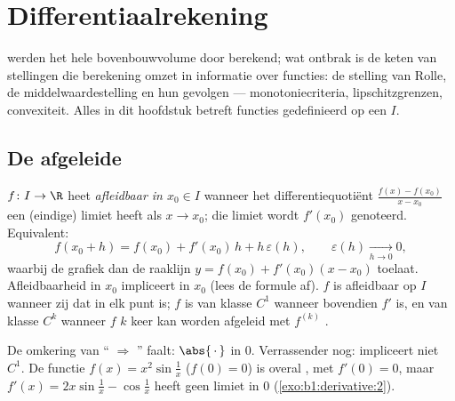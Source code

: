 \chapter{Differentiaalrekening}\label{ch:b1:derivative}

 werden het hele bovenbouwvolume door berekend; wat ontbrak
is de keten van stellingen die berekening omzet in informatie over
functies: de stelling van Rolle, de middelwaardestelling en hun
gevolgen --- monotoniecriteria, lipschitzgrenzen, convexiteit. Alles
in dit hoofdstuk betreft functies gedefinieerd op een  $I$.

\section{De afgeleide}

\begin{definition}\label{def:b1:derivative:def}
$f \colon I \to \R$ heet \emph{afleidbaar in $x_0 \in
I$} wanneer het differentiequotiënt
$\frac{f(x) - f(x_0)}{x - x_0}$ een (eindige) limiet heeft als $x \to
x_0$; die limiet wordt $f'(x_0)$ genoteerd. Equivalent:
\[
f(x_0 + h) = f(x_0) + f'(x_0)\,h + h\,\varepsilon(h),
\qquad \varepsilon(h) \xrightarrow[h \to 0]{} 0 ,
\]
waarbij de grafiek dan de raaklijn $y = f(x_0) + f'(x_0)(x - x_0)$
toelaat. Afleidbaarheid in $x_0$ impliceert  in $x_0$
(lees de formule af). $f$ is afleidbaar op $I$ wanneer zij dat in elk
punt is; $f$ is van klasse $C^1$ wanneer bovendien $f'$  is,
en van klasse $C^k$ wanneer $f$ $k$
keer kan worden afgeleid met $f^{(k)}$ .
\end{definition}

\begin{example}\label{ex:b1:derivative:notc1}
De omkering van `` $\Rightarrow$ '' faalt:
$\abs{\,\cdot\,}$ in $0$. Verrassender nog:  impliceert
niet $C^1$. De functie $f(x) = x^2 \sin\frac 1x$ ($f(0) = 0$) is
overal , met $f'(0) = 0$, maar $f'(x) = 2x \sin\frac1x -
\cos\frac 1x$ heeft geen limiet in $0$
(\cref{exo:b1:derivative:2}).
\end{example}

